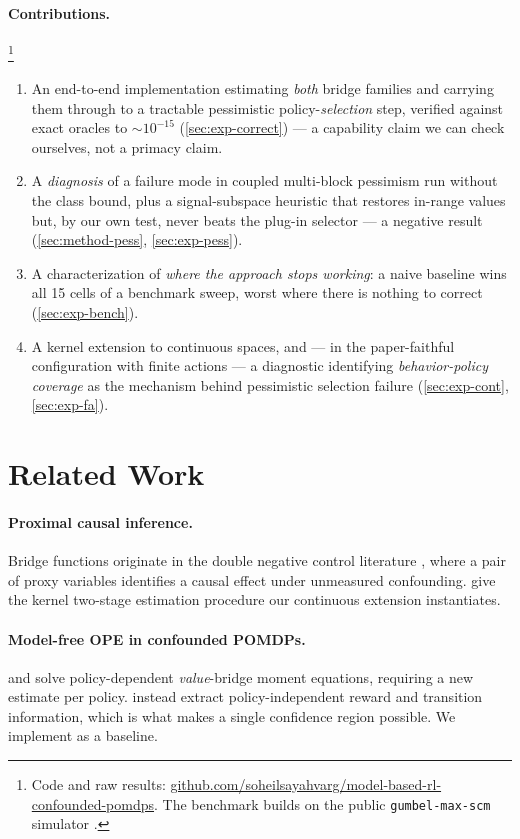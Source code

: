 \documentclass{article}
\theoremstyle{plain}
\theoremstyle{definition}
\begin{document}
\paragraph{Contributions.}\footnote{Code and raw results:
\url{github.com/soheilsayahvarg/model-based-rl-confounded-pomdps}.
The benchmark builds on the public
\texttt{gumbel-max-scm} simulator \citep{oberst2019}.}
\begin{enumerate}\itemsep2pt \parskip0pt 
\item An end-to-end implementation estimating \emph{both} bridge families and
carrying them through to a tractable pessimistic policy-\emph{selection} step,
verified against exact oracles to $\sim\!10^{-15}$ (\cref{sec:exp-correct}) --- a
capability claim we can check ourselves, not a primacy claim.
\item A \emph{diagnosis} of a failure mode in coupled multi-block pessimism run
without the class bound, plus a signal-subspace heuristic that restores in-range
values but, by our own test, never beats the plug-in selector --- a negative
result (\cref{sec:method-pess}, \cref{sec:exp-pess}).
\item A characterization of \emph{where the approach stops working}: a naive
baseline wins all 15 cells of a benchmark sweep, worst where there is nothing to
correct (\cref{sec:exp-bench}).
\item A kernel extension to continuous spaces, and --- in the paper-faithful
configuration with finite actions --- a diagnostic identifying
\emph{behavior-policy coverage} as the mechanism behind pessimistic selection
failure (\cref{sec:exp-cont}, \cref{sec:exp-fa}).
\end{enumerate}

\section{Related Work}
\label{sec:related}

\paragraph{Proximal causal inference.} Bridge functions originate in the double
negative control literature \citep{miao2018,tchetgen2020}, where a pair of proxy
variables identifies a causal effect under unmeasured confounding.
\citet{mastouri2021} give the kernel two-stage estimation procedure our
continuous extension instantiates.

\paragraph{Model-free OPE in confounded POMDPs.} \citet{shi2022} and
\citet{bennett2024} solve policy-dependent \emph{value}-bridge moment equations,
requiring a new estimate per policy. \citet{hong2024} instead extract
policy-independent reward and transition information, which is what makes a
single confidence region possible. We implement \citet{shi2022} as a baseline.
\end{document}
